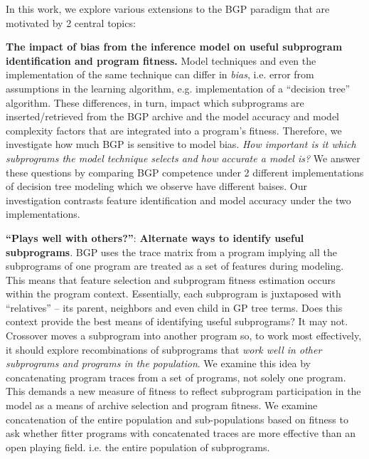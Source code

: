 In this work,  we explore various extensions to the BGP paradigm that are motivated by 2 central topics: \begin{inparaenum}

\item \textbf{The impact of bias from the inference model on useful subprogram identification and program fitness.}  Model techniques and even the implementation of the same technique can differ in  \textit{bias}, i.e. error from assumptions in the learning algorithm, e.g. implementation of a ``decision tree'' algorithm. These differences, in turn, impact which subprograms are inserted/retrieved from the BGP archive and the model accuracy and model complexity factors that are integrated into a program's fitness. Therefore, we investigate how much BGP is sensitive to model bias. %
\textit{How important is it which subprograms the model technique selects and how accurate a model is? }  We answer these questions by comparing BGP competence under 2 different implementations of decision tree modeling which we observe have different baises. Our investigation contrasts feature identification and model accuracy under the two implementations. 

\item \textbf{``Plays well with others?''}: \textbf{Alternate ways to identify useful subprograms}. BGP uses the trace matrix from a program implying all the subprograms of one program are treated as a set of features during modeling. This means that feature selection and subprogram fitness estimation occurs within the program context.  Essentially, each subprogram is juxtaposed with ``relatives'' -- its parent, neighbors and even child in GP tree terms. Does this context provide the best means of identifying useful subprograms? It may not. Crossover moves a subprogram into another program so, to work most effectively, it should explore recombinations of subprograms that \textit{work well in other subprograms and programs in the population}. We examine this idea by concatenating program traces from a set of programs, not solely one program. This demands a new measure of fitness to reflect subprogram participation in the model as a means of archive selection and program fitness. We examine concatenation of the entire population and sub-populations based on fitness to ask whether fitter programs with concatenated traces are more effective than an open playing field. i.e. the entire population of subprograms.  
\end{inparaenum}

